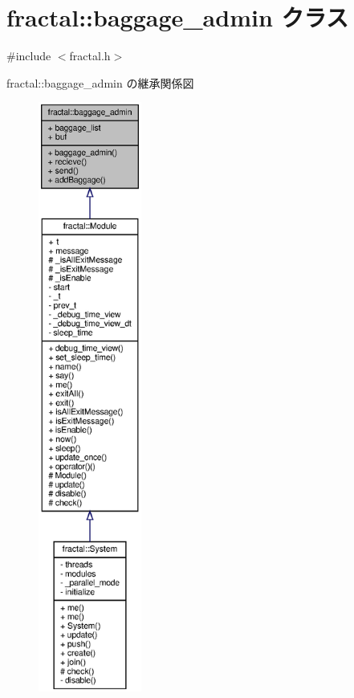 \section{fractal\+:\+:baggage\+\_\+admin クラス}
\label{classfractal_1_1baggage__admin}


{\ttfamily \#include $<$fractal.\+h$>$}



fractal\+:\+:baggage\+\_\+admin の継承関係図
\nopagebreak
\begin{figure}[H]
\begin{center}
\leavevmode
\includegraphics[height=550pt]{classfractal_1_1baggage__admin__inherit__graph}
\end{center}
\end{figure}


